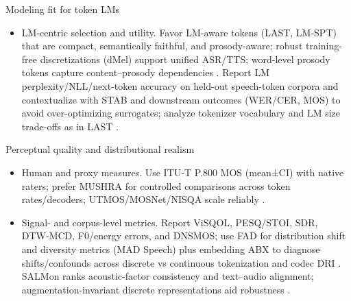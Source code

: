 Modeling fit for token LMs
\begin{itemize}
  \item LM-centric selection and utility. Favor LM-aware tokens (LAST, LM‑SPT) that are compact, semantically faithful, and prosody-aware; robust training-free discretizations (dMel) support unified ASR/TTS; word-level prosody tokens capture content–prosody dependencies \cite{turetzky2024lastlanguagemodelawarespeechtokenization,jo2025lmsptalignedsemanticdistillationspeechto,bai2025dmelspeechtokenizationmadesimple,qian2025prosodylmuncoveringemergingprosodyproces}. Report LM perplexity/NLL/next-token accuracy on held-out speech-token corpora and contextualize with STAB and downstream outcomes (WER/CER, MOS) to avoid over-optimizing surrogates; analyze tokenizer vocabulary and LM size trade-offs as in LAST \cite{vashishth2024stabspeechtokenizerassessmentbenchmark,turetzky2024lastlanguagemodelawarespeechtokenization}.
\end{itemize}

Perceptual quality and distributional realism
\begin{itemize}
  \item Human and proxy measures. Use ITU‑T P.800 MOS (mean±CI) with native raters; prefer MUSHRA for controlled comparisons across token rates/decoders; UTMOS/MOSNet/NISQA scale reliably \cite{nakata2024jchatjapaneselargescalespokendialoguecor,yang2025diffsoundstreamefficientspeechtokenizati}.
  \item Signal- and corpus-level metrics. Report ViSQOL, PESQ/STOI, SDR, DTW‑MCD, F0/energy errors, and DNSMOS; use FAD for distribution shift and diversity metrics (MAD Speech) plus embedding ABX to diagnose shifts/confounds across discrete vs continuous tokenization and codec DRI \cite{fily2024establishingdegreesclosenessbetweenaudio,futeral2025madspeechmeasuresacousticdiversity,li2025continuousspeechtokenizertext,liu2024analyzingmitigatinginconsistencydiscrete}. SALMon ranks acoustic-factor consistency and text–audio alignment; augmentation-invariant discrete representations aid robustness \cite{maimon2025salmonsuiteacousticlanguagemodelevaluati,entry2025augmentationinvariantdiscreterepresentat}.
\end{itemize}

